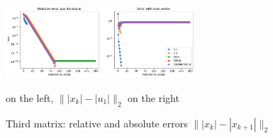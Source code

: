 \documentclass[12pt,twoside]{article}
\begin{document}
\begin{enumerate}
\begin{enumerate}
\begin{figure}[H]
	\centering
	\includegraphics[width=200pt]{figures/random_init_4_abs_error.pdf}
	\caption{Third matrix: relative and absolute errors  $\| |x_k| - |x_{k+1}| \|_2$} on the left,  $\| |x_k| - |u_1| \|_2$ on the right
	\label{fig1}
\end{figure}

\end{enumerate}

\end{enumerate}
\end{document}
